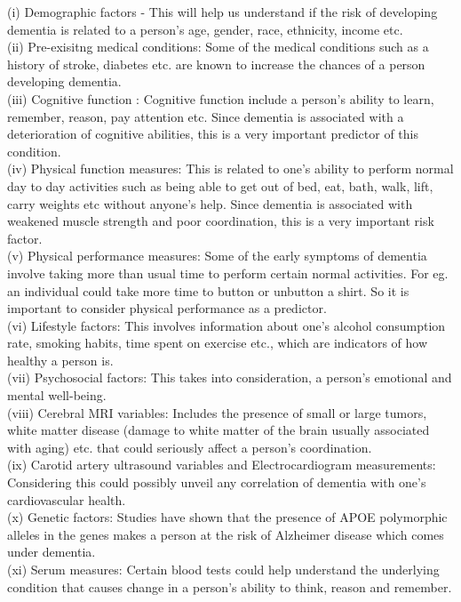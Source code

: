 \documentclass[12pt,letterpaper]{article}
\begin{document}
(i) Demographic factors - This will help us understand if the risk of developing dementia is related to a person's age, gender, race, ethnicity, income etc.\\
(ii) Pre-exisitng medical conditions: Some of the medical conditions such as a history of stroke, diabetes etc. are known to increase the chances of a person developing dementia. \\
(iii)  Cognitive function : Cognitive function include a person's ability to learn, remember, reason, pay attention etc.  Since dementia is associated with a deterioration of cognitive abilities, this is a very important predictor of this condition. \\
(iv) Physical function measures: This is related to one's ability to perform normal day to day activities such as being able to get out of bed, eat, bath, walk, lift, carry weights etc without anyone's help. Since dementia is associated with weakened muscle strength and poor coordination, this is a very important risk factor.        \\            
(v) Physical performance measures: Some of the early symptoms of dementia involve taking more than usual time to perform certain normal activities. For eg. an individual could take more time to button or unbutton a shirt. So it is important to consider physical performance as a predictor.\\
(vi) Lifestyle factors: This involves information about one's alcohol consumption rate, smoking habits, time spent on exercise etc., which are indicators of how healthy a person is. \\
(vii) Psychosocial factors: This takes into consideration, a person's emotional and mental well-being. \\
(viii) Cerebral MRI variables: Includes the presence of small or large tumors, white matter disease (damage to white matter of the brain usually associated with aging) etc. that could seriously affect a person's coordination.\\
(ix) Carotid artery ultrasound variables and Electrocardiogram measurements: Considering this could possibly unveil any correlation of dementia with one's cardiovascular health.\\
(x) Genetic factors: Studies have shown that the presence of APOE polymorphic alleles in the genes makes a person at the risk of Alzheimer disease which comes under dementia.\\
(xi) Serum measures: Certain blood tests could help understand the underlying condition that causes change in a person's ability to think, reason and remember. \\
\end{document}
